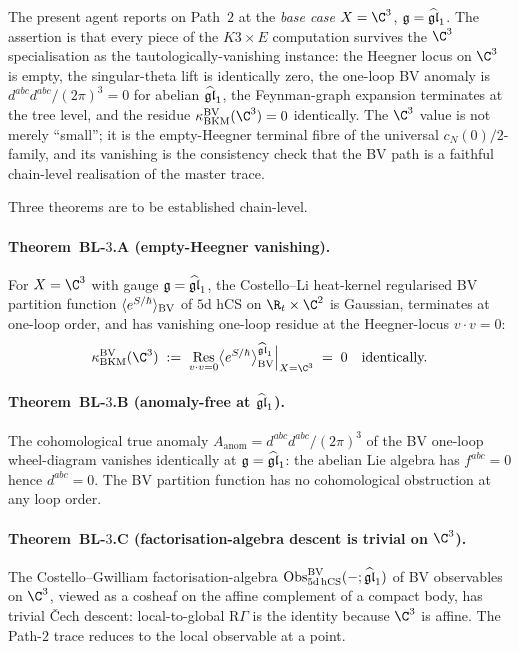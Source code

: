 The present agent reports on Path~$2$ at the \emph{base case}
$X = \C^3$, $\mathfrak{g} = \widehat{\mathfrak{gl}}_1$. The assertion is that every piece of
the $K3\times E$ computation survives the $\C^3$ specialisation as
the tautologically-vanishing instance: the Heegner locus on $\C^3$
is empty, the singular-theta lift is identically zero, the one-loop
BV anomaly is $d^{abc}d^{abc}/(2\pi)^3 = 0$ for abelian $\widehat{\mathfrak{gl}}_1$, the
Feynman-graph expansion terminates at the tree level, and the residue
$\kBKM^{\mathrm{BV}}(\C^3) = 0$ identically. The $\C^3$ value is not
merely ``small''; it is the empty-Heegner terminal fibre of the
universal $c_N(0)/2$-family, and its vanishing is the consistency
check that the BV path is a faithful chain-level realisation of the
master trace.

Three theorems are to be established chain-level.

\paragraph{Theorem~BL-$3$.A (empty-Heegner vanishing).}
For $X = \C^3$ with gauge $\mathfrak{g} = \widehat{\mathfrak{gl}}_1$, the Costello--Li heat-kernel
regularised BV partition function $\langle e^{S/\hbar}\rangle_{\mathrm{BV}}$ of
$5$d hCS on $\R_t\times\C^2$ is Gaussian, terminates at one-loop
order, and has vanishing one-loop residue at the
Heegner-locus $v\cdot v = 0$:
\[
  \kBKM^{\mathrm{BV}}(\C^3)
  \;:=\;
  \operatorname*{Res}_{v\cdot v = 0}
  \bigl\langle e^{S/\hbar}\bigr\rangle_\BV^{\ghat}\Big|_{X = \C^3}
  \;=\; 0
  \quad\text{identically.}
\]

\paragraph{Theorem~BL-$3$.B (anomaly-free at $\widehat{\mathfrak{gl}}_1$).}
The cohomological true anomaly $A_{\mathrm{anom}} =
d^{abc}d^{abc}/(2\pi)^3$ of the BV one-loop wheel-diagram vanishes
identically at $\mathfrak{g} = \widehat{\mathfrak{gl}}_1$: the abelian Lie algebra has
$f^{abc} = 0$ hence $d^{abc} = 0$. The BV partition function has no
cohomological obstruction at any loop order.

\paragraph{Theorem~BL-$3$.C (factorisation-algebra descent is trivial on $\C^3$).}
The Costello--Gwilliam factorisation-algebra
$\mathrm{Obs}^{\mathrm{BV}}_{5\mathrm{d\,hCS}}(-;\widehat{\mathfrak{gl}}_1)$ of BV observables on $\C^3$,
viewed as a cosheaf on the affine complement of a compact body, has
trivial \v{C}ech descent: local-to-global $\mathrm{R}\Gamma$ is the
identity because $\C^3$ is affine. The Path-$2$ trace reduces to the
local observable at a point.

